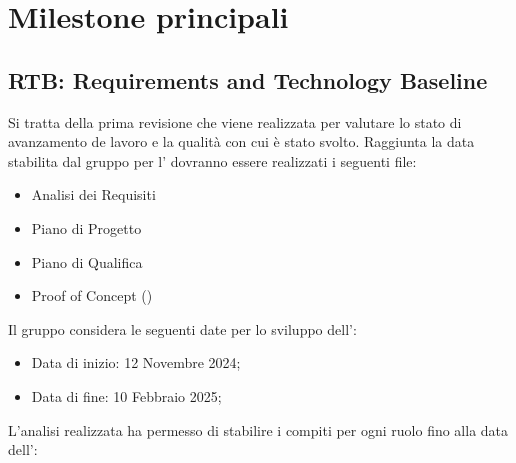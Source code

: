\section{Milestone principali}
\label{sec:milestone_principali}
\subsection{RTB: Requirements and Technology Baseline}
Si tratta della prima revisione che viene realizzata per valutare lo stato di avanzamento de lavoro e la qualità con cui è stato svolto.
Raggiunta la data stabilita dal gruppo per l' dovranno essere realizzati i seguenti file:

\begin{itemize}
\item Analisi dei Requisiti
\item Piano di Progetto
\item Piano di Qualifica
\item Proof of Concept ()
\end{itemize}
Il gruppo considera le seguenti date per lo sviluppo dell':
\begin{itemize}
    \item Data di inizio: 12 Novembre 2024;
    \item Data di fine: 10 Febbraio 2025;
\end{itemize}
L'analisi realizzata ha permesso di stabilire i compiti per ogni ruolo fino alla data dell':
